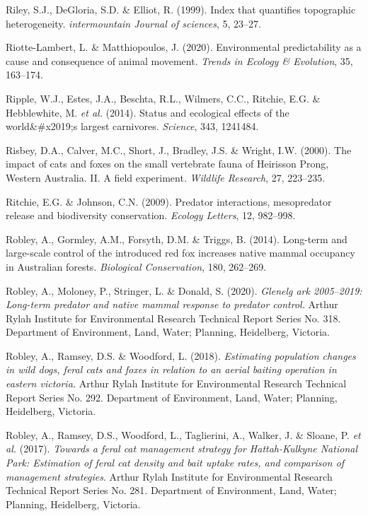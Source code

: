 \documentclass[11pt,a4paper,titlepage,twoside,openright]{style/unimelbthesis}
\begin{document}
\begin{mainmatter}
\leavevmode\hypertarget{ref-riley1999index}{}%
Riley, S.J., DeGloria, S.D. \& Elliot, R. (1999). Index that quantifies topographic heterogeneity. \emph{intermountain Journal of sciences}, 5, 23--27.

\leavevmode\hypertarget{ref-riotte-lambert2020environmental}{}%
Riotte-Lambert, L. \& Matthiopoulos, J. (2020). Environmental predictability as a cause and consequence of animal movement. \emph{Trends in Ecology \& Evolution}, 35, 163--174.

\leavevmode\hypertarget{ref-ripple2014status}{}%
Ripple, W.J., Estes, J.A., Beschta, R.L., Wilmers, C.C., Ritchie, E.G. \& Hebblewhite, M. \emph{et al.} (2014). Status and ecological effects of the world\&\#x2019;s largest carnivores. \emph{Science}, 343, 1241484.

\leavevmode\hypertarget{ref-risbey2000impacts}{}%
Risbey, D.A., Calver, M.C., Short, J., Bradley, J.S. \& Wright, I.W. (2000). The impact of cats and foxes on the small vertebrate fauna of Heirisson Prong, Western Australia. II. A field experiment. \emph{Wildlife Research}, 27, 223--235.

\leavevmode\hypertarget{ref-ritchie2009predator}{}%
Ritchie, E.G. \& Johnson, C.N. (2009). Predator interactions, mesopredator release and biodiversity conservation. \emph{Ecology Letters}, 12, 982--998.

\leavevmode\hypertarget{ref-robley2014long}{}%
Robley, A., Gormley, A.M., Forsyth, D.M. \& Triggs, B. (2014). Long-term and large-scale control of the introduced red fox increases native mammal occupancy in Australian forests. \emph{Biological Conservation}, 180, 262--269.

\leavevmode\hypertarget{ref-robley2020glenelg}{}%
Robley, A., Moloney, P., Stringer, L. \& Donald, S. (2020). \emph{Glenelg ark 2005--2019: Long-term predator and native mammal response to predator control.} Arthur Rylah Institute for Environmental Research Technical Report Series No. 318. Department of Environment, Land, Water; Planning, Heidelberg, Victoria.

\leavevmode\hypertarget{ref-robley2018estimating}{}%
Robley, A., Ramsey, D.S. \& Woodford, L. (2018). \emph{Estimating population changes in wild dogs, feral cats and foxes in relation to an aerial baiting operation in eastern victoria.} Arthur Rylah Institute for Environmental Research Technical Report Series No. 292. Department of Environment, Land, Water; Planning, Heidelberg, Victoria.

\leavevmode\hypertarget{ref-robley2017towards}{}%
Robley, A., Ramsey, D.S., Woodford, L., Taglierini, A., Walker, J. \& Sloane, P. \emph{et al.} (2017). \emph{Towards a feral cat management strategy for Hattah-Kulkyne National Park: Estimation of feral cat density and bait uptake rates, and comparison of management strategies}. Arthur Rylah Institute for Environmental Research Technical Report Series No. 281. Department of Environment, Land, Water; Planning, Heidelberg, Victoria.


\end{mainmatter}
\end{document}
